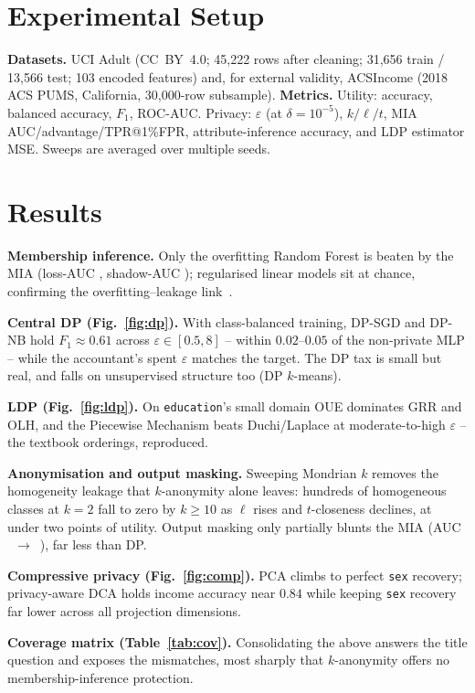 \documentclass[conference]{IEEEtran}
\begin{document}
\section{Experimental Setup}
\textbf{Datasets.} UCI Adult (CC~BY~4.0; 45{,}222 rows after cleaning; 31{,}656
train / 13{,}566 test; 103 encoded features) and, for external validity,
ACSIncome (2018 ACS PUMS, California, 30{,}000-row subsample). \textbf{Metrics.}
Utility: accuracy, balanced accuracy, $F_1$, ROC-AUC. Privacy: $\varepsilon$ (at
$\delta=10^{-5}$), $k/\ell/t$, MIA AUC/advantage/TPR@1\%FPR, attribute-inference
accuracy, and LDP estimator MSE. Sweeps are averaged over multiple seeds.

\section{Results}
\textbf{Membership inference.} Only the overfitting Random Forest is beaten by
the MIA (loss-AUC \RFlossMIA, shadow-AUC \RFshadowMIA); regularised linear models
sit at chance, confirming the overfitting--leakage link~\cite{yeom2018privacy}.

\textbf{Central DP (Fig.~\ref{fig:dp}).} With class-balanced training, DP-SGD and
DP-NB hold $F_1\approx0.61$ across $\varepsilon\in[0.5,8]$ -- within $0.02$--$0.05$
of the non-private MLP -- while the accountant's spent $\varepsilon$ matches the
target. The DP tax is small but real, and falls on unsupervised structure too
(DP $k$-means).

\textbf{LDP (Fig.~\ref{fig:ldp}).} On \texttt{education}'s small domain OUE
dominates GRR and OLH, and the Piecewise Mechanism beats Duchi/Laplace at
moderate-to-high $\varepsilon$ -- the textbook orderings, reproduced.

\textbf{Anonymisation and output masking.} Sweeping Mondrian $k$ removes the
homogeneity leakage that $k$-anonymity alone leaves: hundreds of homogeneous
classes at $k{=}2$ fall to zero by $k\ge10$ as $\ell$ rises and $t$-closeness
declines, at under two points of utility. Output masking only partially blunts
the MIA (AUC \MIAfull~$\to$~\MIAlabel), far less than DP.

\textbf{Compressive privacy (Fig.~\ref{fig:comp}).} PCA climbs to perfect
\texttt{sex} recovery; privacy-aware DCA holds income accuracy near $0.84$ while
keeping \texttt{sex} recovery far lower across all projection dimensions.

\textbf{Coverage matrix (Table~\ref{tab:cov}).} Consolidating the above answers
the title question and exposes the mismatches, most sharply that $k$-anonymity
offers no membership-inference protection.
\end{document}
